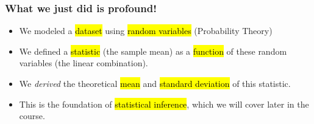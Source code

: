 \documentclass[slidestop,compress,mathserif]{beamer}
\makeatletter
\def\chp3@path{../../Chp 3}
\makeatother
\begin{document}
\begin{frame}
  \frametitle{What we just did is profound!}
  \begin{itemize}
    \item We modeled a \hl{dataset} using \hl{random variables} (Probability Theory)
    \item We defined a \hl{statistic} (the sample mean) as a \hl{function} of these random variables (the linear combination).
    \item We \emph{derived} the theoretical \hl{mean} and \hl{standard deviation} of this statistic.
    \item This is the foundation of \hl{statistical inference}, which we will cover later in the course.
  \end{itemize}
\end{frame}













\end{document}
